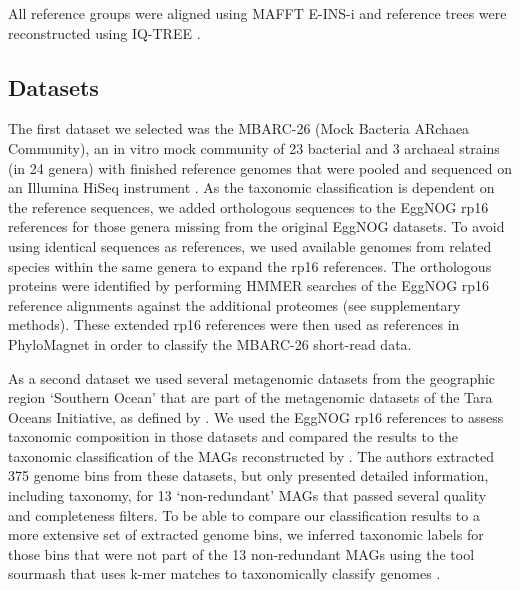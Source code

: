 \documentclass{bioinfo}
\begin{document}
\begin{methods}
All reference groups were aligned using MAFFT E-INS-i \citep{Katoh2013} and reference trees were reconstructed using IQ-TREE \citep[under the LG+G+F model;][]{Nguyen2015}.

\subsection{Datasets}
The first dataset we selected was the MBARC-26 (Mock Bacteria ARchaea Community), an in vitro mock community of 23 bacterial and 3 archaeal strains (in 24 genera) with finished reference genomes that were pooled and sequenced on an Illumina HiSeq instrument \citep{Singer2016}. As the taxonomic classification is dependent on the reference sequences, we added orthologous sequences to the EggNOG rp16 references for those genera missing from the original EggNOG datasets. To avoid using identical sequences as references, we used available genomes from related species within the same genera to expand the rp16 references. The orthologous proteins were identified by performing HMMER \citep[v3.1b2;][]{Eddy2011} searches of the EggNOG rp16 reference alignments against the additional proteomes (see supplementary methods). These extended rp16 references were then used as references in PhyloMagnet in order to classify the MBARC-26 short-read data. 

As a second dataset we used several metagenomic datasets from the geographic region ‘Southern Ocean’ that are part of the metagenomic datasets of the Tara Oceans Initiative, as defined by \cite{Delmont2018}. We used the EggNOG rp16 references to assess taxonomic composition in those datasets and compared the results to the taxonomic classification of the MAGs reconstructed by \cite{Delmont2018}. The authors extracted 375 genome bins from these datasets, but only presented detailed information, including taxonomy, for 13 ‘non-redundant’ MAGs that passed several quality and completeness filters. To be able to compare our classification results to a more extensive set of extracted genome bins, we inferred taxonomic labels for those bins that were not part of the 13 non-redundant MAGs using the tool sourmash that uses k-mer matches to taxonomically classify genomes \citep{TitusBrown2016}.


\end{methods}
\end{document}
